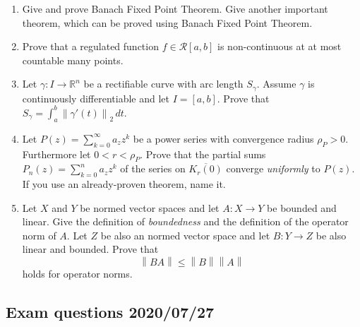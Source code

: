\documentclass{article}
\newcommand{\norm}[1]{\left\|#1\right\|}
\begin{document}
\begin{enumerate}
  \item Give and prove Banach Fixed Point Theorem. Give another important theorem, which can be proved using Banach Fixed Point Theorem.
  \item Prove that a regulated function $f \in \mathcal R[a,b]$ is non-continuous at at most countable many points.
  \item Let $\gamma: I \to \mathbb R^n$ be a rectifiable curve with arc length $S_\gamma$. Assume $\gamma$ is continuously differentiable and let $I = [a,b]$. Prove that $S_\gamma = \int_a^b \norm{\gamma'(t)}_2 \, dt$.
  \item Let $P(z) = \sum_{k=0}^\infty a_z z^k$ be a power series with convergence radius $\rho_P > 0$. Furthermore let $0 < r < \rho_P$. Prove that the partial sums $P_n(z) = \sum_{k=0}^n a_z z^k$ of the series on $\overline{K_r(0)}$ converge \emph{uniformly} to $P(z)$. If you use an already-proven theorem, name it.
  \item Let $X$ and $Y$ be normed vector spaces and let $A: X \to Y$ be bounded and linear. Give the definition of \emph{boundedness} and the definition of the operator norm of $A$. Let $Z$ be also an normed vector space and let $B: Y \to Z$ be also linear and bounded. Prove that
  \[ \norm{BA} \leq \norm{B} \norm{A} \]
  holds for operator norms.
\end{enumerate}

\subsection{Exam questions 2020/07/27}
\end{document}
